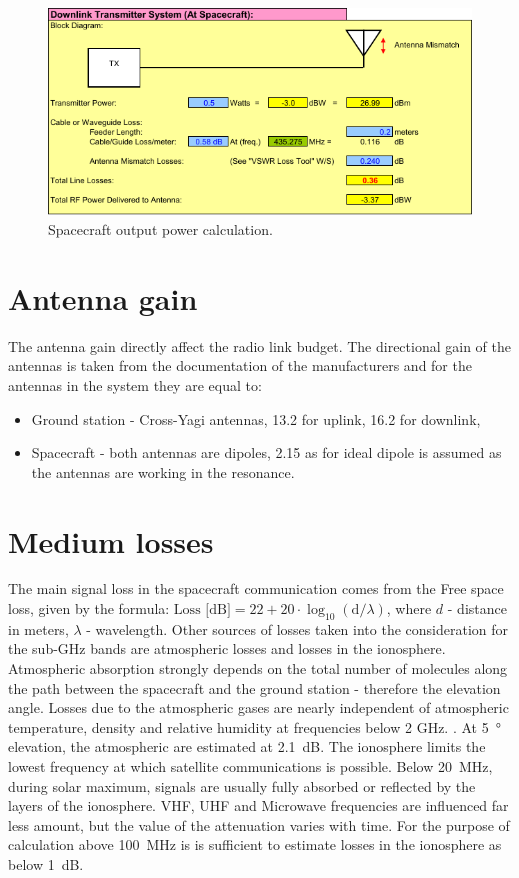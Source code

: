 \begin{figure}
    \centering
    \includegraphics[width=0.8\paperwidth]{img/8/tx_spacecraft.pdf}
    \caption{Spacecraft output power calculation.}
    \label{link:tx_spacecraft}
\end{figure}


\section{Antenna gain}
The antenna gain directly affect the radio link budget. The directional gain of the antennas is taken from the documentation of the manufacturers and for the antennas in the system they are equal to:
\begin{itemize}
    \item Ground station - Cross-Yagi antennas, \SI{13.2}{\dBi} for uplink, \SI{16.2}{\dBi} for downlink,
    \item Spacecraft - both antennas are dipoles, \SI{2.15}{\dBi} as for ideal dipole is assumed as the antennas are working in the resonance. 
\end{itemize}


\section{Medium losses}
The main signal loss in the spacecraft communication comes from the Free space loss, given by the formula: $\text{Loss [dB]} = 22 + 20 \cdot \log_{10} (\text{d}/\lambda)$, where $d$ - distance in meters, $\lambda$ - wavelength. Other sources of losses taken into the consideration for the sub-GHz bands are atmospheric losses and losses in the ionosphere. Atmospheric absorption strongly depends on the total number of molecules along the path between the spacecraft and the ground station - therefore the elevation angle. Losses due to the atmospheric gases are nearly independent of atmospheric temperature, density and relative humidity at frequencies below 2 GHz. \cite{sat_propagation}. At \SI{5}{\degree} elevation, the atmospheric are estimated at \SI{2.1}{\dB}. The ionosphere limits the lowest frequency at which satellite communications is possible. Below \SI{20}{\MHz}, during solar maximum, signals are usually fully absorbed or reflected by the layers of the ionosphere. VHF, UHF and Microwave frequencies are influenced far less amount, but the value of the attenuation varies with time. For the purpose of calculation above \SI{100}{\MHz} is is sufficient to estimate losses in the ionosphere as below \SI{1}{\dB}.


